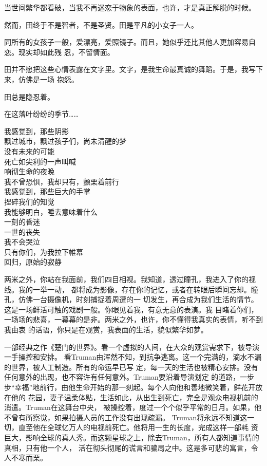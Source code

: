 		当世间繁华都看破，当我不再迷恋于物象的表面，也许，才是真正解脱的时候。

		然而，田终于不是智者，不是圣贤。田是平凡的小女子一人。

		同所有的女孩子一般，爱漂亮，爱照镜子。而且，她似乎还比其他人更加容易自恋。现实却如此残
	忍，不留情面。

		田并不愿把这些心情表露在文字里。文字，是我生命最真诚的舞蹈。于是，我写下来，仿佛是一场
	抱怨。

		田总是隐忍着。

		在这落叶纷纷的季节……

	\endwriting



		\longpoem{}{}{}
			我感觉到，那些阴影 \\
			飘过城市，飘过孩子们，尚未清醒的梦 \\
			没有未来的可能 \\
			死亡如尖利的一声叫喊 \\
			响彻生命的夜晚 \\
			我不曾恐惧，我却只有，颤栗着前行 \\
			我感觉到，那些巨大的手掌 \\
			捏碎我们的知觉 \\
			我能够明白，睡去意味着什么 \\
			一刻的昏迷 \\
			一世的丧失 \\
			我不会哭泣 \\
			只有你们，为我拉下帷幕 \\
			回归，原始的寂静
		\endlongpoem

	\endwriting



		两米之外，你站在我面前，我们四目相视。我知道，透过瞳孔，我进入了你的视线。我的一举一动，
	都将成为影像，存在你的记忆，或者在转眼后瞬间忘却。瞳孔，仿佛一台摄像机，时刻捕捉着周遭的一
	切发生，再合成为我们生活的情节。这是一场鲜活可触的戏剧一般。你眼见着我，有意无意的表演。我
	目睹着你们，一场场的悲喜，一幕幕的是非。两米之外，也许，你不懂得我真实的表情，听不到我由衷
	的话语，你只是在观赏，我表面的生活，貌似繁华如梦。

		一部经典之作《楚门的世界》。看一个虚拟的人间，在大众的观赏需求下，被导演一手操控和安排。
	看Truman由浑然不知，到抗争逃离。这一个完满的，滴水不漏的世界，被人工制造。所有的命运早已写
	定，每一天的生活也被精心安排。没有任何意外的出现，也不容许有任何意外。Truman要沿着导演划定
	的道路，一步步“幸福”地前行，由他生命开始的那一刻起。每个人向他和善地微笑着，鲜花开放在他的
	花园，妻子温柔体贴，生活如此，从出生到死亡，完全是观众电视机前的消遣。Truman在这舞台中央，
	被操控着，度过一个个似乎平常的日月。如果，他不曾有所察觉，如果拍摄人员的工作没有出现疏漏。
	Truman将永远不知道这一切，直至他在全球亿万人的电视前死亡。他将用一生的长度，完成这样一部耗
	资巨大，影响全球的真人秀。而这颗星球之上，除去Truman，所有人都知道事情的真相，只有他一个人，
	活在彻头彻尾的谎言和骗局之中。这是多可悲的寓言，令人不寒而栗。

